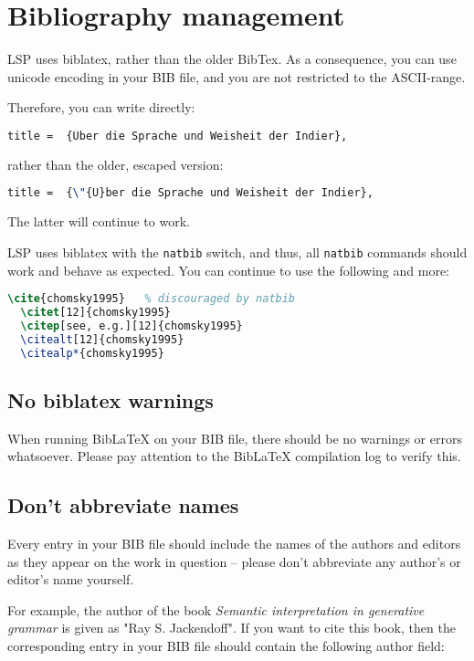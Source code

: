 \documentclass[output=paper,colorlinks,citecolor=brown,chinesefont]{langscibook}
\begin{document}
{\section{Bibliography management}
\label{sec:bibl-manag:Chen}

LSP uses biblatex, rather than the older BibTex. As a consequence, you can use unicode encoding in your BIB file, and you are not restricted to the ASCII-range.

Therefore, you can write directly:

\begin{lstlisting}[language=tex]
title =  {Über die Sprache und Weisheit der Indier},
\end{lstlisting}

rather than the older, escaped version:

\begin{lstlisting}[language=tex]
title =  {\"{U}ber die Sprache und Weisheit der Indier},
\end{lstlisting}

The latter will continue to work.

LSP uses biblatex with the \texttt{natbib} switch, and thus, all \texttt{natbib} commands  should work and behave as expected. You can continue to use the following and more:

\begin{lstlisting}[language=tex]
  \cite{chomsky1995}   % discouraged by natbib
  \citet[12]{chomsky1995}
  \citep[see, e.g.][12]{chomsky1995}
  \citealt[12]{chomsky1995}
  \citealp*{chomsky1995}
\end{lstlisting}

\subsection{No biblatex warnings}

When running BibLaTeX on your BIB file, there should be no warnings or errors whatsoever. Please pay attention to the BibLaTeX compilation log to verify this.

\subsection{Don't abbreviate names}

Every entry in your BIB file should include the names of the authors and editors as they appear on the work in question -- please don't abbreviate any author's or editor's name yourself.

For example, the author of the book \emph{Semantic interpretation in generative grammar} is given as "Ray S. Jackendoff". If you want to cite this book, then the corresponding entry in your BIB file should contain the following author field:

}
\end{document}
